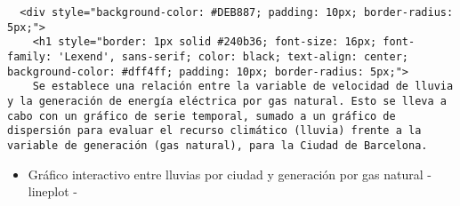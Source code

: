 \documentclass[11pt]{article}
\providecommand{\tightlist}{%
      \setlength{\itemsep}{0pt}\setlength{\parskip}{0pt}}
\begin{document}
    
    
    \begin{verbatim}
  <div style="background-color: #DEB887; padding: 10px; border-radius: 5px;">
    <h1 style="border: 1px solid #240b36; font-size: 16px; font-family: 'Lexend', sans-serif; color: black; text-align: center; background-color: #dff4ff; padding: 10px; border-radius: 5px;">
    Se establece una relación entre la variable de velocidad de lluvia y la generación de energía eléctrica por gas natural. Esto se lleva a cabo con un gráfico de serie temporal, sumado a un gráfico de dispersión para evaluar el recurso climático (lluvia) frente a la variable de generación (gas natural), para la Ciudad de Barcelona.
\end{verbatim}

    \begin{itemize}
\tightlist
\item
  Gráfico interactivo entre lluvias por ciudad y generación por gas
  natural - lineplot -
\end{itemize}
\end{document}
